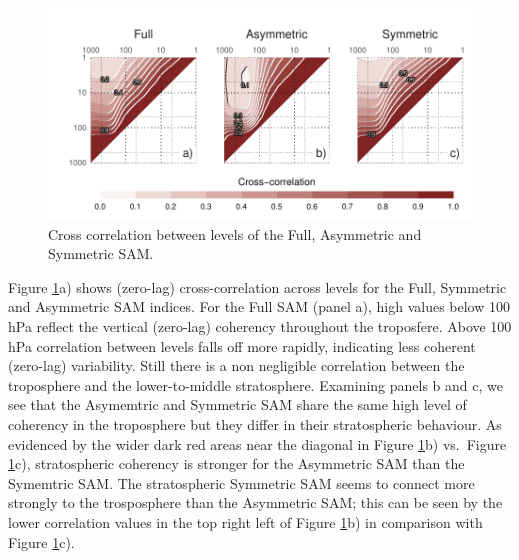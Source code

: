 \documentclass[twocol]{ametsocV5}
\begin{document}
\begin{figure}
\includegraphics{cross-correlation-1} \caption[Cross correlation between levels of the Full, Asymmetric and Symmetric SAM]{Cross correlation between levels of the Full, Asymmetric and Symmetric SAM.}\label{fig:cross-correlation}
\end{figure}

Figure \ref{fig:cross-correlation}a) shows (zero-lag) cross-correlation
across levels for the Full, Symmetric and Asymmetric SAM indices. For
the Full SAM (panel a), high values below 100 hPa reflect the vertical
(zero-lag) coherency throughout the troposfere. Above 100 hPa
correlation between levels falls off more rapidly, indicating less
coherent (zero-lag) variability. Still there is a non negligible
correlation between the troposphere and the lower-to-middle
stratosphere. Examining panels b and c, we see that the Asymemtric and
Symmetric SAM share the same high level of coherency in the troposphere
but they differ in their stratospheric behaviour. As evidenced by the
wider dark red areas near the diagonal in Figure
\ref{fig:cross-correlation}b) vs.~Figure \ref{fig:cross-correlation}c),
stratospheric coherency is stronger for the Asymmetric SAM than the
Symemtric SAM. The stratospheric Symmetric SAM seems to connect more
strongly to the trosposphere than the Asymmetric SAM; this can be seen
by the lower correlation values in the top right left of Figure
\ref{fig:cross-correlation}b) in comparison with Figure
\ref{fig:cross-correlation}c).
\end{document}
